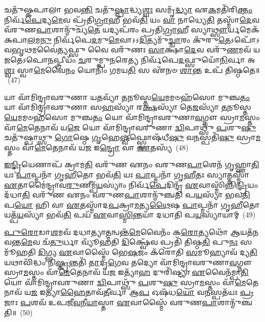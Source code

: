 𑌚𑌤𑍁᳴𑌷𑍍𑌕𑌪𑌾𑌲𑌾 𑌭𑌵\-\ul{𑌨𑍍𑌤𑌿} 𑌚𑌤𑍁᳴\-\ul{𑌷𑍍𑌪𑌾}\-𑌦𑍍𑌧𑍍𑌯\-\ul{𑌶𑍍𑌵𑌃} 𑌸𑌮𑍃᳴\-\ul{𑌦𑍍𑌧𑍍𑌯𑌾} 𑌏\-\ul{𑌕}\-𑌮𑌤𑌿᳴𑌰𑌿\-\ul{𑌕𑍍𑌤𑌂} 𑌨𑌿𑌰𑍍𑌵᳴\-\ul{𑌪𑍇}\-𑌦𑍍𑌯\-\ul{𑌮𑍇}\-𑌵 𑌪𑍍𑌰᳴𑌤𑌿\-\ul{𑌗𑍍𑌰𑌾}\-𑌹𑍀 𑌭𑌵᳴\-\ul{𑌤𑌿} 𑌯𑌂 \ul{𑌵𑌾} 𑌨𑌾𑌧𑍍𑌯𑍇\-\ul{𑌤𑌿} 𑌤𑌸𑍍𑌮𑌾᳴\-\ul{𑌦𑍇}\-𑌵 𑌵᳴𑌰𑍁𑌣\-\ul{𑌪𑌾}\-𑌶𑌾𑌨𑍍𑌮𑍁᳴𑌚𑍍𑌯\-\ul{𑌤𑍇} 𑌯𑌦𑍍𑌯𑌪᳴𑌰𑌂 𑌪𑍍𑌰𑌤𑌿\-\ul{𑌗𑍍𑌰𑌾}\-𑌹𑍀 𑌸𑍍𑌯𑌾\-\ul{𑌥𑍍𑌸𑍗}\-𑌰𑍍𑌯𑌮𑍇𑌕᳴𑌕𑌪𑌾\-\ul{𑌲}\-𑌮\-\ul{𑌨𑍁} 𑌨𑌿𑌰𑍍𑌵᳴𑌪𑍇\-\ul{𑌦}\-𑌮𑍁\-\ul{𑌮𑍇}\-𑌵𑌾𑌽𑌽\-\ul{𑌦𑌿}\-𑌤𑍍𑌯𑌮𑍁᳴\-\ul{𑌚𑍍𑌚𑌾}\-𑌰𑌂 𑌕𑍁᳴𑌰𑍁\-\ul{𑌤𑍇}\-\-𑌽𑌪𑍋᳴\-𑌽𑌵\-\ul{𑌭𑍃}\-𑌥𑌮𑌵𑍈॑\-\ul{𑌤𑍍𑌯}\-𑌫𑍍𑌸𑍁 𑌵𑍈 𑌵𑌰𑍁᳴𑌣𑌃 \ul{𑌸𑌾}\-𑌕𑍍𑌷𑌾\-\ul{𑌦𑍇}\-𑌵 𑌵𑌰𑍁᳴\-\ul{𑌣}\-𑌮𑌵᳴ 𑌯𑌜𑌤𑍇\-𑌽𑌪𑍋\-\ul{𑌨}\-𑌪𑍍𑌤𑍍𑌰𑍀𑌯𑌂᳴ \ul{𑌚}\-𑌰𑍁𑌮𑍍𑌪𑍁\-\ul{𑌨}\-𑌰𑍇\-\ul{𑌤𑍍𑌯} 𑌨𑌿𑌰𑍍𑌵᳴𑌪𑍇\-\ul{𑌦}\-𑌫𑍍𑌸𑍁𑌯𑍋᳴\-\ul{𑌨𑌿}\-𑌰𑍍𑌵𑌾 𑌅\-\ul{𑌶𑍍𑌵𑌃} 𑌸𑍍𑌵𑌾\-\ul{𑌮𑍇}\-𑌵𑍈\-\ul{𑌨𑌂} 𑌯𑍋𑌨𑌿𑌂᳴ 𑌗𑌮𑌯\-\ul{𑌤𑌿} 𑌸 𑌏᳴𑌨𑍞 \ul{𑌶𑌾}\-𑌨𑍍𑌤 𑌉𑌪᳴ 𑌤𑌿𑌷𑍍𑌠𑌤𑍇॥~(47)

{\anuvakamend[{\-\ul{𑌮𑍁}\-\-\ul{𑌞𑍍𑌚}\-\-\ul{𑌤𑌿} \ul{𑌚}\-𑌰𑍁𑍞 \ul{𑌸}\-𑌪𑍍𑌤𑌦᳴𑌶 𑌚}]}%

𑌯𑌾 𑌵𑌾᳴𑌮𑌿𑌨𑍍𑌦𑍍𑌰𑌾𑌵𑌰𑍁𑌣𑌾 𑌯\-\ul{𑌤}\-𑌵𑍍𑌯𑌾᳴ \ul{𑌤}\-𑌨𑍂𑌸𑍍𑌤\-\ul{𑌯𑍇}\-𑌮𑌮𑍞𑌹᳴𑌸𑍋 𑌮𑍁𑌞𑍍𑌚\-\ul{𑌤𑌂} 𑌯𑌾 𑌵𑌾᳴𑌮𑌿𑌨𑍍𑌦𑍍𑌰𑌾𑌵𑌰𑍁𑌣𑌾 𑌸\-\ul{𑌹}\-𑌸𑍍𑌯𑌾᳴ 𑌰\-\ul{𑌕𑍍𑌷}\-𑌸𑍍𑌯𑌾᳴ 𑌤𑍇\-\ul{𑌜}\-𑌸𑍍𑌯𑌾᳴ \ul{𑌤}\-𑌨𑍂𑌸𑍍𑌤\-\ul{𑌯𑍇}\-𑌮𑌮𑍞𑌹᳴𑌸𑍋 𑌮𑍁𑌞𑍍𑌚\-\ul{𑌤𑌂} 𑌯𑍋 𑌵𑌾᳴𑌮𑌿𑌨𑍍𑌦𑍍𑌰𑌾𑌵𑌰𑍁𑌣𑌾\-\ul{𑌵}\-𑌗𑍍𑌨𑍗 𑌸𑍍𑌰𑌾\-\ul{𑌮}\-𑌸𑍍𑌤𑌂 𑌵𑌾᳴\-\ul{𑌮𑍇}\-𑌤𑍇𑌨𑌾𑌵᳴ 𑌯\-\ul{𑌜𑍇} 𑌯𑍋 𑌵𑌾᳴𑌮𑌿𑌨𑍍𑌦𑍍𑌰𑌾𑌵𑌰𑍁𑌣𑌾 \ul{𑌦𑍍𑌵𑌿}\-𑌪𑌾𑌥𑍍𑌸𑍁᳴ \ul{𑌪}\-𑌶𑍁\-\ul{𑌷𑍁} 𑌚𑌤𑍁᳴𑌷𑍍𑌪𑌾𑌥𑍍𑌸𑍁 \ul{𑌗𑍋}\-𑌷𑍍𑌠𑍇 \ul{𑌗𑍃}\-𑌹𑍇\-\ul{𑌷𑍍𑌵}\-𑌫𑍍𑌸𑍍𑌵𑍋𑌷᳴𑌧𑍀\-\ul{𑌷𑍁} 𑌵\-\ul{𑌨}\-𑌸𑍍𑌪𑌤𑌿᳴\-\ul{𑌷𑍁} 𑌸𑍍𑌰𑌾\-\ul{𑌮}\-𑌸𑍍𑌤𑌂 𑌵𑌾᳴\-\ul{𑌮𑍇}\-𑌤𑍇𑌨𑌾𑌵᳴ 𑌯\-\ul{𑌜} 𑌇\-\ul{𑌨𑍍𑌦𑍍𑌰𑍋} 𑌵𑌾 \ul{𑌏}\-𑌤𑌸𑍍𑌯᳴~(48)

\-\ul{𑌇}\-\-\ul{𑌨𑍍𑌦𑍍𑌰𑌿}\-𑌯𑍇𑌣𑌾𑌪᳴ 𑌕𑍍𑌰𑌾𑌮\-\ul{𑌤𑌿} 𑌵𑌰𑍁᳴𑌣 𑌏𑌨𑌂 𑌵𑌰𑍁𑌣\-\ul{𑌪𑌾}\-𑌶𑍇𑌨᳴ 𑌗𑍃𑌹𑍍𑌣𑌾\-\ul{𑌤𑌿} 𑌯𑌃 \ul{𑌪𑌾}\-𑌪𑍍𑌮𑌨𑌾᳴ 𑌗𑍃\-\ul{𑌹𑍀}\-𑌤𑍋 𑌭𑌵᳴\-\ul{𑌤𑌿} 𑌯𑌃 \ul{𑌪𑌾}\-𑌪𑍍𑌮𑌨𑌾᳴ 𑌗𑍃\-\ul{𑌹𑍀}\-𑌤𑌃 𑌸𑍍𑌯𑌾𑌤𑍍𑌤𑌸𑍍𑌮𑌾᳴ \ul{𑌏}\-𑌤𑌾𑌮𑍈॑𑌨𑍍𑌦𑍍𑌰𑌾𑌵\-\ul{𑌰𑍁}\-𑌣𑍀𑌮𑍍𑌪᳴\-\ul{𑌯}\-𑌸𑍍𑌯𑌾𑌂॑ 𑌨𑌿𑌰𑍍𑌵᳴\-\ul{𑌪𑍇}\-𑌦𑌿𑌨𑍍𑌦𑍍𑌰᳴ \ul{𑌏}\-𑌵𑌾𑌸𑍍𑌮𑌿᳴𑌨𑍍𑌨𑌿\-\ul{𑌨𑍍𑌦𑍍𑌰𑌿}\-𑌯𑌂 𑌦᳴𑌧𑌾\-\ul{𑌤𑌿} 𑌵𑌰𑍁᳴𑌣 𑌏𑌨𑌂 𑌵𑌰𑍁𑌣\-\ul{𑌪𑌾}\-𑌶𑌾𑌨𑍍𑌮𑍁᳴𑌞𑍍𑌚𑌤𑌿 𑌪\-\ul{𑌯}\-𑌸𑍍𑌯𑌾᳴ 𑌭𑌵\-\ul{𑌤𑌿} 𑌪\-\ul{𑌯𑍋} 𑌹𑌿 𑌵𑌾 \ul{𑌏}\-𑌤𑌸𑍍𑌮𑌾᳴𑌦\-\ul{𑌪}\-𑌕𑍍𑌰𑌾\-\ul{𑌮}\-𑌤𑍍𑌯\-\ul{𑌥𑍈}\-𑌷 \ul{𑌪𑌾}\-𑌪𑍍𑌮𑌨𑌾᳴ 𑌗𑍃\-\ul{𑌹𑍀}\-𑌤𑍋 𑌯𑌤𑍍𑌪᳴\-\ul{𑌯}\-𑌸𑍍𑌯𑌾᳴ 𑌭𑌵᳴\-\ul{𑌤𑌿} 𑌪𑌯᳴ \ul{𑌏}\-𑌵𑌾\-\ul{𑌸𑍍𑌮𑌿}\-𑌨𑍍𑌤𑌯𑌾᳴ 𑌦𑌧𑌾𑌤𑌿 𑌪\-\ul{𑌯}\-𑌸𑍍𑌯𑌾᳴𑌯𑌾𑌮𑍍~(49)

\-\ul{𑌪𑍁}\-\-\ul{𑌰𑍋}\-𑌡𑌾\-\ul{𑌶}\-𑌮𑌵᳴ 𑌦𑌧𑌾𑌤𑍍𑌯𑌾\-\ul{𑌤𑍍𑌮}\-𑌨𑍍𑌵𑌨𑍍𑌤᳴\-\ul{𑌮𑍇}\-𑌵𑍈𑌨𑌂᳴ 𑌕\-\ul{𑌰𑍋}\-𑌤𑍍𑌯𑌥𑍋᳴ \ul{𑌆}\-𑌯𑌤᳴𑌨𑌵𑌨𑍍𑌤\-\ul{𑌮𑍇}\-𑌵 𑌚᳴\-\ul{𑌤𑍁}\-𑌰𑍍𑌧𑌾 𑌵𑍍𑌯𑍂᳴𑌹𑌤𑌿 \ul{𑌦𑌿}\-𑌕𑍍𑌷𑍍𑌵𑍇᳴𑌵 𑌪𑍍𑌰𑌤𑌿᳴ 𑌤𑌿𑌷𑍍𑌠\-\ul{𑌤𑌿} 𑌪𑍁\-\ul{𑌨𑌃} 𑌸𑌮𑍂᳴𑌹𑌤𑌿 \ul{𑌦𑌿}\-𑌗𑍍𑌭𑍍𑌯 \ul{𑌏}\-𑌵𑌾𑌸𑍍𑌮𑍈᳴ 𑌭𑍇\-\ul{𑌷}\-𑌜𑌂 𑌕᳴𑌰𑍋𑌤𑌿 \ul{𑌸}\-𑌮𑍂𑌹𑍍𑌯𑌾𑌵᳴ 𑌦𑍍𑌯\-\ul{𑌤𑌿} 𑌯𑌥𑌾𑌵𑌿᳴𑌦𑍍𑌧𑌂 𑌨𑌿\-\ul{𑌷𑍍𑌕𑍃}\-𑌨𑍍𑌤𑌤𑌿᳴ \ul{𑌤𑌾}\-𑌦𑍃\-\ul{𑌗𑍇}\-𑌵 𑌤𑌦𑍍𑌯𑍋 𑌵𑌾᳴𑌮𑌿𑌨𑍍𑌦𑍍𑌰𑌾𑌵𑌰𑍁𑌣𑌾\-\ul{𑌵}\-𑌗𑍍𑌨𑍗 𑌸𑍍𑌰𑌾\-\ul{𑌮}\-𑌸𑍍𑌤𑌂 𑌵𑌾᳴\-\ul{𑌮𑍇}\-𑌤𑍇𑌨𑌾𑌵᳴ 𑌯\-\ul{𑌜} 𑌇𑌤𑍍𑌯𑌾᳴\-\ul{𑌹} 𑌦𑍁𑌰𑌿᳴𑌷𑍍𑌟𑍍𑌯𑌾 \ul{𑌏}\-𑌵𑍈𑌨᳴𑌮𑍍𑌪𑌾\-\ul{𑌤𑌿} 𑌯𑍋 𑌵𑌾᳴𑌮𑌿𑌨𑍍𑌦𑍍𑌰𑌾𑌵𑌰𑍁𑌣𑌾 \ul{𑌦𑍍𑌵𑌿}\-𑌪𑌾𑌥𑍍𑌸𑍁᳴ \ul{𑌪}\-𑌶𑍁\-\ul{𑌷𑍁} 𑌸𑍍𑌰𑌾\-\ul{𑌮}\-𑌸𑍍𑌤𑌂 𑌵𑌾᳴\-\ul{𑌮𑍇}\-𑌤𑍇𑌨𑌾𑌵᳴ 𑌯\-\ul{𑌜} 𑌇𑌤𑍍𑌯𑌾᳴\-\ul{𑌹𑍈}\-𑌤𑌾𑌵᳴\-\ul{𑌤𑍀}\-𑌰𑍍𑌵𑌾 𑌆\-\ul{𑌪} 𑌓𑌷᳴𑌧\-\ul{𑌯𑍋} 𑌵\-\ul{𑌨}\-𑌸𑍍𑌪𑌤᳴𑌯𑌃 \ul{𑌪𑍍𑌰}\-𑌜𑌾𑌃 \ul{𑌪}\-𑌶𑌵᳴ 𑌉𑌪𑌜𑍀\-\ul{𑌵}\-𑌨𑍀\-\ul{𑌯𑌾}\-𑌸𑍍𑌤𑌾 \ul{𑌏}\-𑌵𑌾𑌸𑍍𑌮𑍈᳴ 𑌵𑌰𑍁𑌣\-\ul{𑌪𑌾}\-𑌶𑌾𑌨𑍍𑌮𑍁᳴𑌞𑍍𑌚𑌤𑌿॥~(50)

